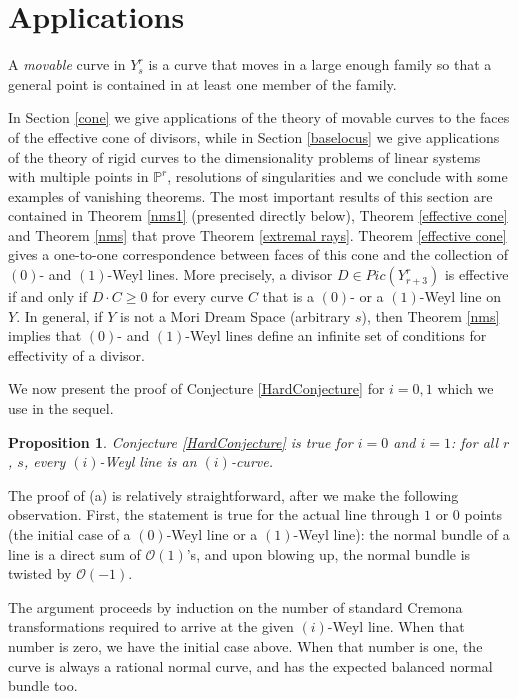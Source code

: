 \documentclass[12pt]{article}
\newtheorem{proposition}[equation]{Proposition}
\numberwithin{equation}{section}
\numberwithin{subeq}{equation}
\def\calO{\mathcal{O}}
\begin{document}
\section{Applications}\label{apl}
A \emph{movable} curve in $Y^r_s$ is a curve that moves in a large enough family so that a general point is contained in at least one member of the family.

In Section \ref{cone} we give applications of the theory of movable curves 
to the faces of the effective cone of divisors, 
while in Section \ref{baselocus} we give applications of the theory of rigid curves 
to the dimensionality problems of linear systems with multiple points in $\mathbb{P}^r$, 
resolutions of singularities and we conclude with some examples of vanishing theorems. 
The most important results of this section are contained in Theorem \ref{nms1} (presented directly below), 
Theorem \ref{effective cone} and Theorem \ref{nms} 
that prove Theorem \ref{extremal rays}. 
Theorem \ref{effective cone}
gives a one-to-one correspondence between faces of this cone
and the collection of $(0)$- and $(1)$-Weyl lines. 
More precisely, a divisor $D\in Pic(Y^r_{r+3})$ is effective 
if and only if $D \cdot C \geq 0$ for every curve $C$ that is a $(0)$- or a $(1)$-Weyl line on $Y$.
In general, if $Y$ is not a Mori Dream Space (arbitrary $s$),
then Theorem \ref{nms} implies that
$(0)$- and $(1)$-Weyl lines define an infinite set of conditions for effectivity of a divisor.

We now present the proof of Conjecture \ref{HardConjecture} for $i =0,1$ which we use in the sequel.

\begin{proposition}\label{ConjectureProofTheorem}
Conjecture \ref{HardConjecture} is true for $i = 0$ and $i=1$:
for all $r$, $s$, every $(i)$-Weyl line is an $(i)$-curve.
\end{proposition}

\medskip{}
The proof of (a) is relatively straightforward, after we make the following observation.
First, the statement is true for the actual line through $1$ or $0$ points (the initial case of a $(0)$-Weyl line or a $(1)$-Weyl line): the normal bundle of a line is a direct sum of $\calO(1)$'s, and upon blowing up, the normal bundle is twisted by $\calO(-1)$.

The argument proceeds by induction on the number of standard Cremona transformations required to arrive at the given $(i)$-Weyl line.  When that number is zero, we have the initial case above.  When that number is one, the curve is always a rational normal curve, and has the expected balanced normal bundle too.
\end{document}
